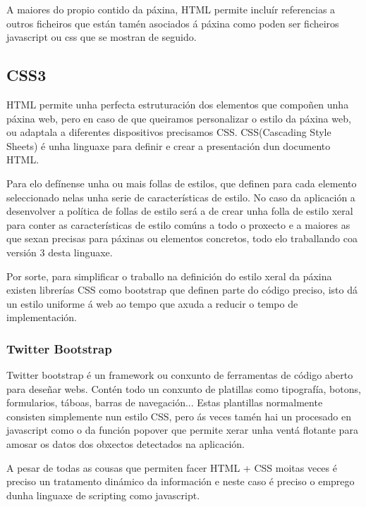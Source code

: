         A maiores do propio contido da páxina, HTML permite incluír referencias a outros ficheiros que 
        están tamén asociados á páxina como poden ser ficheiros javascript ou css que se mostran de 
        seguido.
    
    \subsection{CSS3}
        HTML permite unha perfecta estruturación dos elementos que compoñen unha páxina web, pero 
        en caso de que queiramos personalizar o estilo da páxina web, ou adaptala a diferentes 
        dispositivos precisamos CSS. CSS(Cascading Style Sheets) é unha linguaxe para definir e 
        crear a presentación dun documento HTML.
        
        Para elo defínense unha ou mais follas de estilos, que definen para cada elemento 
        seleccionado nelas unha serie de características de estilo. No caso da aplicación a 
        desenvolver a política de follas de estilo será a de crear unha folla de estilo xeral para 
        conter as características de estilo comúns a todo o proxecto e a maiores as que sexan 
        precisas para páxinas ou elementos concretos, todo elo traballando coa versión 3 desta linguaxe.
    
        Por sorte, para simplificar o traballo na definición do estilo xeral da páxina existen 
        librerías CSS como bootstrap que definen parte do código preciso, isto dá un estilo 
        uniforme á web ao tempo que axuda a reducir o tempo de implementación.
        
        \subsubsection{Twitter Bootstrap}
            Twitter bootstrap é un framework ou conxunto de ferramentas de código aberto para 
            deseñar webs. Contén todo un conxunto de platillas como tipografía, botons, formularios,
            táboas, barras de navegación... Estas plantillas normalmente consisten simplemente nun
            estilo CSS, pero ás veces tamén hai un procesado en javascript como o da función popover
            que permite xerar unha ventá flotante para amosar os datos dos obxectos detectados na 
            aplicación.
            
            A pesar de todas as cousas que permiten facer HTML + CSS moitas veces é preciso un 
            tratamento dinámico da información e neste caso é preciso o emprego dunha linguaxe de 
            scripting como javascript.
    
